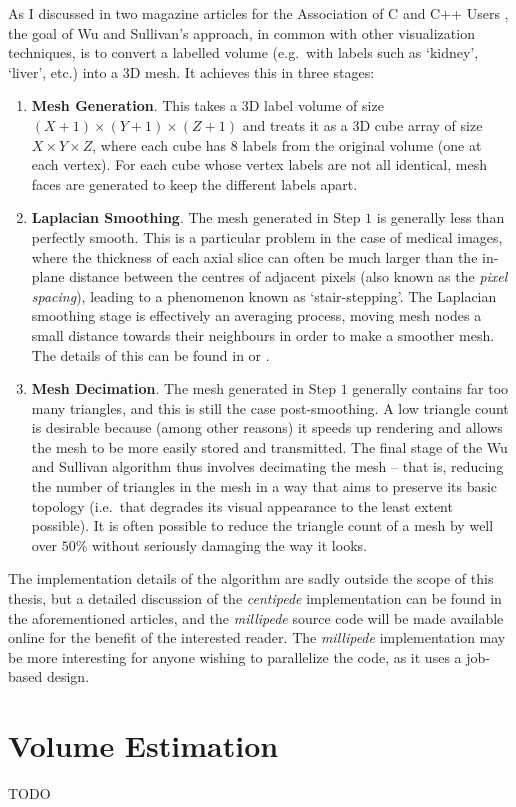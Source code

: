 As I discussed in two magazine articles for the Association of C and C++ Users \cite{golodetz08vis1,golodetz08vis2}, the goal of Wu and Sullivan's approach, in common with other visualization techniques, is to convert a labelled volume (e.g.~with labels such as `kidney', `liver', etc.) into a 3D mesh. It achieves this in three stages:
%
\begin{enumerate}

\item \textbf{Mesh Generation}. This takes a 3D label volume of size $(X+1) \times (Y+1) \times (Z+1)$ and treats it as a 3D cube array of size $X \times Y \times Z$, where each cube has $8$ labels from the original volume (one at each vertex). For each cube whose vertex labels are not all identical, mesh faces are generated to keep the different labels apart.
\item \textbf{Laplacian Smoothing}. The mesh generated in Step $1$ is generally less than perfectly smooth. This is a particular problem in the case of medical images, where the thickness of each axial slice can often be much larger than the in-plane distance between the centres of adjacent pixels (also known as the \emph{pixel spacing}), leading to a phenomenon known as `stair-stepping'. The Laplacian smoothing stage is effectively an averaging process, moving mesh nodes a small distance towards their neighbours in order to make a smoother mesh. The details of this can be found in \cite{wu03} or \cite{golodetz08vis2}.
\item \textbf{Mesh Decimation}. The mesh generated in Step $1$ generally contains far too many triangles, and this is still the case post-smoothing. A low triangle count is desirable because (among other reasons) it speeds up rendering and allows the mesh to be more easily stored and transmitted. The final stage of the Wu and Sullivan algorithm thus involves decimating the mesh -- that is, reducing the number of triangles in the mesh in a way that aims to preserve its basic topology (i.e.~that degrades its visual appearance to the least extent possible). It is often possible to reduce the triangle count of a mesh by well over $50\%$ without seriously damaging the way it looks.

\end{enumerate}
%
The implementation details of the algorithm are sadly outside the scope of this thesis, but a detailed discussion of the \emph{centipede} implementation can be found in the aforementioned articles, and the \emph{millipede} source code will be made available online for the benefit of the interested reader. The \emph{millipede} implementation may be more interesting for anyone wishing to parallelize the code, as it uses a job-based design.

\section{Volume Estimation}

TODO
